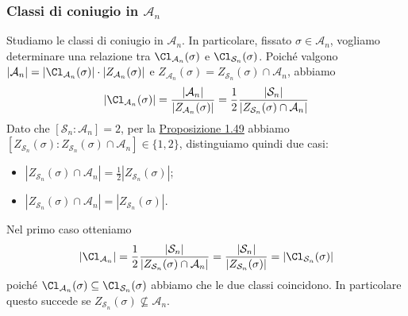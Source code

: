 \documentclass[11pt]{scrartcl}
\begin{document}
\subsubsection{Classi di coniugio in $\mathcal{A}_n$}

Studiamo le classi di coniugio in $\mathcal{A}_n$. In particolare,
fissato $\sigma \in \mathcal{A}_n$, vogliamo determinare una relazione tra
$\Cl_{\mathcal{A}_n}(\sigma)$ e $\Cl_{\mathcal{S}_n}(\sigma)$.
Poiché valgono $|\mathcal{A}_n| = |\Cl_{\mathcal{A}_n}(\sigma)|\cdot |Z_{\mathcal{A}_n}(\sigma)|$
e $Z_{\mathcal{A}_n}(\sigma) = Z_{\mathcal{S}_n}(\sigma) \cap \mathcal{A}_n$, abbiamo
\[
    |\Cl_{\mathcal{A}_n}(\sigma)| = \frac{|\mathcal{A}_n|}{|Z_{\mathcal{A}_n}(\sigma)|} =
    \frac 1 2 \frac{|\mathcal{S}_n|}{|Z_{\mathcal{S}_n}(\sigma) \cap \mathcal{A}_n|}
\]
Dato che $[\mathcal{S}_n:\mathcal{A}_n] = 2$, per la \hyperref[prop1.49]{Proposizione 1.49}
abbiamo $[Z_{\mathcal{S}_n}(\sigma):Z_{\mathcal{S}_n}(\sigma) \cap \mathcal{A}_n] \in \{1, 2\}$,
distinguiamo quindi due casi:
\begin{itemize}
    \item $|Z_{\mathcal{S}_n}(\sigma) \cap \mathcal{A}_n| = \displaystyle\frac 1 2 |Z_{\mathcal{S}_n}(\sigma)|$;
    \item $|Z_{\mathcal{S}_n}(\sigma) \cap \mathcal{A}_n| = |Z_{\mathcal{S}_n}(\sigma)|$.
\end{itemize}

Nel primo caso otteniamo 
\[
    |\Cl_{\mathcal{A}_n}| = \frac 1 2 \frac{|\mathcal{S}_n|}{|Z_{\mathcal{S}_n}(\sigma) \cap \mathcal{A}_n|} =
    \frac{|\mathcal{S}_n|}{|Z_{\mathcal{S}_n}(\sigma)|} = |\Cl_{\mathcal{S}_n}(\sigma)|
\]
poiché $\Cl_{\mathcal{A}_n}(\sigma)\subseteq \Cl_{\mathcal{S}_n}(\sigma)$ abbiamo che le
due classi coincidono. In particolare questo succede se $Z_{\mathcal{S}_n}(\sigma)
\nsubseteq \mathcal{A}_n$.
\end{document}

